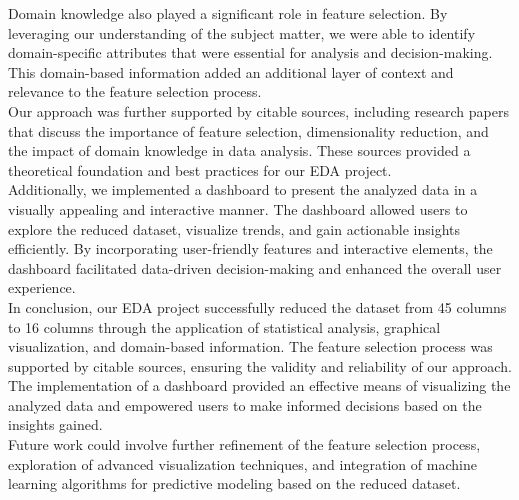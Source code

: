 \noindent
Domain knowledge also played a significant role in feature selection. By leveraging our understanding of the subject matter, we were able to identify domain-specific attributes that were essential for analysis and decision-making. This domain-based information added an additional layer of context and relevance to the feature selection process.\\
\noindent
Our approach was further supported by citable sources, including research papers that discuss the importance of feature selection, dimensionality reduction, and the impact of domain knowledge in data analysis. These sources provided a theoretical foundation and best practices for our EDA project.\\
\noindent
Additionally, we implemented a dashboard to present the analyzed data in a visually appealing and interactive manner. The dashboard allowed users to explore the reduced dataset, visualize trends, and gain actionable insights efficiently. By incorporating user-friendly features and interactive elements, the dashboard facilitated data-driven decision-making and enhanced the overall user experience.\\
\noindent
In conclusion, our EDA project successfully reduced the dataset from 45 columns to 16 columns through the application of statistical analysis, graphical visualization, and domain-based information. The feature selection process was supported by citable sources, ensuring the validity and reliability of our approach. The implementation of a dashboard provided an effective means of visualizing the analyzed data and empowered users to make informed decisions based on the insights gained.\\ 
\noindent
Future work could involve further refinement of the feature selection process, exploration of advanced visualization techniques, and integration of machine learning algorithms for predictive modeling based on the reduced dataset.




